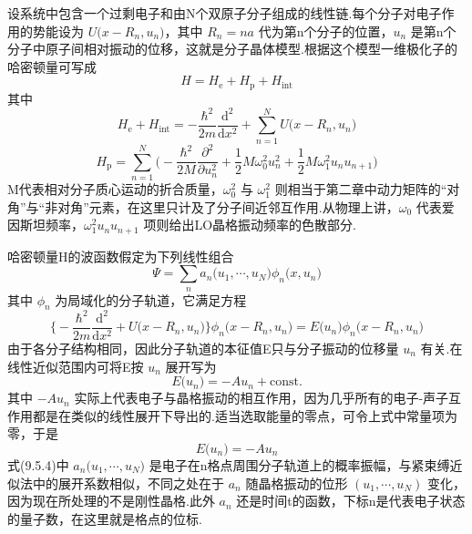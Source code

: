 设系统中包含一个过剩电子和由N个双原子分子组成的线性链.每个分子对电子作用的势能设为 $U\bigl(x-R_{n},u_{n}\bigr)$，其中 $R_{n}=na$ 代为第n个分子的位置，$u_{n}$ 是第n个分子中原子间相对振动的位移，这就是分子晶体模型.根据这个模型一维极化子的哈密顿量可写成
\begin{equation}
  H=H_{\mathrm e}+H_{\mathrm p}+H_{\mathrm{int}}
\end{equation}
其中
\begin{equation}
  H_{\mathrm e}+H_{\mathrm{int}}
  =-\frac{\hbar^{2}}{2m}\frac{\mathrm{d}^{2}}{\mathrm{d}x^{2}}
  +\sum_{n=1}^{N}U\bigl(x-R_{n},u_{n}\bigr)
\end{equation}
\begin{equation}
  H_{\mathrm p}=\sum_{n=1}^{N}\biggl(
  -\frac{\hbar^{2}}{2M}\frac{\partial^{2}}{\partial u_{n}^{2}}
  +\frac{1}{2}M\omega_{0}^{2}u_{n}^{2}
  +\frac{1}{2}M\omega_{1}^{2}u_{n}u_{n+1}\biggr)
\end{equation}
M代表相对分子质心运动的折合质量，$\omega_{0}^{2}$ 与 $\omega_{1}^{2}$ 则相当于第二章中动力矩阵的“对角”与“非对角”元素，在这里只计及了分子间近邻互作用.从物理上讲，$\omega_{0}$ 代表爱因斯坦频率，$\omega_{1}^{2}u_{n}u_{n+1}$ 项则给出LO晶格振动频率的色散部分.

哈密顿量H的波函数假定为下列线性组合
\begin{equation}
  \varPsi=\sum_{n}a_{n}\bigl(u_{1},\cdots,u_{N}\bigr)
  \phi_{n}\bigl(x,u_{n}\bigr)
\end{equation}
其中 $\phi_{n}$ 为局域化的分子轨道，它满足方程
\begin{equation}
  \biggl\{-\frac{\hbar^{2}}{2m}\frac{\mathrm{d}^{2}}{\mathrm{d}x^{2}}
  +U\bigl(x-R_{n},u_{n}\bigr)\biggr\}
  \phi_{n}\bigl(x-R_{n},u_{n}\bigr)
  =E\bigl(u_{n}\bigr)\phi_{n}\bigl(x-R_{n},u_{n}\bigr)
\end{equation}
由于各分子结构相同，因此分子轨道的本征值E只与分子振动的位移量 $u_{n}$ 有关.在线性近似范围内可将E按 $u_{n}$ 展开写为
\begin{equation*}
  E\bigl(u_{n}\bigr)=-Au_{n}+\mathrm{const.}
\end{equation*}
其中 $-Au_{n}$ 实际上代表电子与晶格振动的相互作用，因为几乎所有的电子-声子互作用都是在类似的线性展开下导出的.适当选取能量的零点，可令上式中常量项为零，于是
\begin{equation}
  E\bigl(u_{n}\bigr)=-Au_{n}
\end{equation}
式(9.5.4)中 $a_{n}\bigl(u_{1},\cdots,u_{N}\bigr)$ 是电子在n格点周围分子轨道上的概率振幅，与紧束缚近似法中的展开系数相似，不同之处在于 $a_{n}$ 随晶格振动的位形 $\left(u_{1},\cdots,u_{N}\right)$ 变化，因为现在所处理的不是刚性晶格.此外 $a_{n}$ 还是时间t的函数，下标n是代表电子状态的量子数，在这里就是格点的位标.

